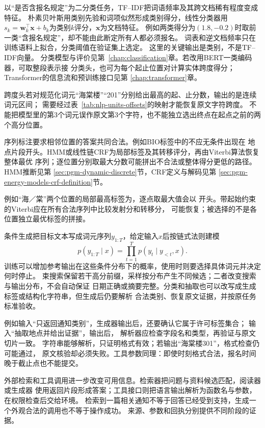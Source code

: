 以“是否含报名规定”为二分类任务，TF--IDF把词语频率及其跨文档稀有程度变成特征。
朴素贝叶斯用类别先验和词项似然形成类别得分，线性分类器用
$s_k=\bm{w}_k^\top\bm{x}+b_k$为类别$k$评分，$\bm{x}$为文档特征。
例如两类得分为$(1.8,-0.2)$时取前一类“含报名规定”，却不能由此断定所有人都必须报名。
词表和逆文档频率只在训练语料上拟合，分类阈值在验证集上选定。
这里的关键输出是类别，不是TF--IDF向量。
分类模型与评价见第~\ref{chap:classification}章。若改用BERT一类编码器，可取整段表示接
分类头，也可为每个起止位置对计算实体跨度得分；Transformer的信息流和预训练接口见第
\ref{chap:transformer}章。

跨度头若对规范化词元“海棠楼”“201”分别给出最高的起、止分数，输出的是连续词元区间；
需要经过表~\ref{tab:nlp-units-offsets}的映射才能恢复原文字符跨度。
不能把模型里的第3个词元误作原文第3个字符，也不能独立选出终点在起点之前的两个高分位置。

序列标注要求相邻位置的答案共同合法。例如BIO标签中的不应无条件出现在
地点片段开头。HMM或线性链CRF为局部标签及其转移评分，再由Viterbi算法恢复整体最优
序列；逐位置分别取最大分数可能拼出不合法或整体得分更低的路径。HMM推断见第
\ref{sec:pgm-dynamic-discrete}节，CRF定义与解码见第
\ref{sec:pgm-energy-models-crf-definition}节。

例如“海／棠”两个位置的局部最高标签为，逐点取最大值会以
开头。带起始约束的Viterbi应在所有合法序列中比较发射分和转移分，
可能恢复；被选择的不是各位置独立最优标签的拼接。

条件生成把目标文本写成词元序列$y_{1:T}$，给定输入$x$后按链式法则建模
\begin{equation}
  p(y_{1:T}\mid x)
  =
  \prod_{t=1}^{T}p(y_t\mid y_{<t},x).
  \label{eq:nlp-conditional-generation}
\end{equation}
训练可以增加参考输出在这些条件分布下的概率，使用时则要选择具体词元并决定何时停止。
束搜索保留若干高分前缀，采样按分布产生不同候选；二者改变搜索与输出分布，不会自动保证
日期正确或摘要完整。分类和抽取也可以改写成生成标签或结构化字符串，但生成后仍要解析
合法类别、恢复原文证据，并按原任务标准验收。

例如输入“只返回通知类别”，生成器输出后，还要确认它属于许可标签集合；
输入“抽取地点并给出证据”，输出\code{venue=海棠楼201; span=[39,45)}后，
解析器应检查字段名和类型，再验证与原文切片一致。
字符串能够解析，只证明格式有效；若输出“海棠楼301”，格式检查仍可能通过，
原文核验却必须失败。工具参数同理：即使时刻格式合法，报名时间晚于截止点也不能提交。

外部检索和工具调用进一步改变可用信息。检索器把问题与资料候选匹配，阅读器或生成器
使用返回片段形成答案；工具接口则把语言输出解析为函数名与参数，在权限检查后交给环境。
检索到一篇相关通知不等于回答已经受到支持，生成一个外观合法的调用也不等于操作成功。
来源、参数和回执分别提供不同阶段的证据。

